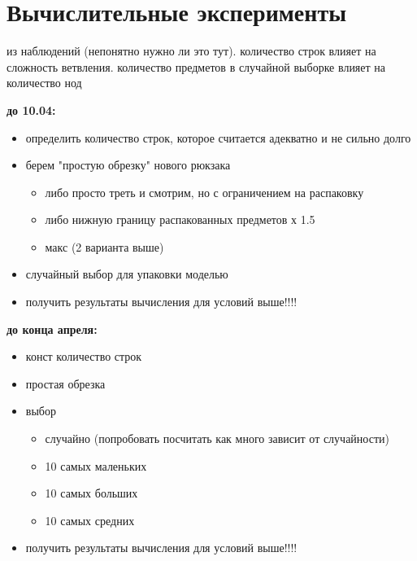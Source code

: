 \documentclass[a4paper]{article}
\begin{document}
    
    \section{Вычислительные эксперименты}

    из наблюдений (непонятно нужно ли это тут). количество строк влияет на сложность ветвления. количество предметов в случайной выборке влияет на количество нод 
        
    \begin{tcolorbox}[
        colback=red!5,
        colframe=black!50,
        title=Промежуточный план работы,
        sharp corners,
        boxrule=0.5pt,
        left=1mm,right=1mm,top=1mm,bottom=1mm
    ]

    \textbf{до 10.04:}
    \begin{itemize}
        \setlength{\itemsep}{0.15em}
        \setlength{\parskip}{0pt}
        \setlength{\parsep}{0pt}
        \item определить количество строк, которое считается адекватно и не сильно долго
        \item берем "простую обрезку" нового рюкзака
        \begin{itemize}
            \setlength{\itemsep}{0.15em}
            \setlength{\parskip}{0pt}
            \setlength{\parsep}{0pt}
            \item либо просто треть и смотрим, но с ограничением на распаковку
            \item либо нижную границу распакованных предметов х 1.5
            \item макс (2 варианта выше)
        \end{itemize}
        \item случайный выбор для упаковки моделью
        \item получить результаты вычисления для условий выше!!!!
    \end{itemize}
    
    \textbf{до конца апреля:}
    \begin{itemize}
        \setlength{\itemsep}{0.15em}
        \setlength{\parskip}{0pt}
        \setlength{\parsep}{0pt}
        \item конст количество строк
        \item простая обрезка
        \item выбор
        \begin{itemize}
            \setlength{\itemsep}{0.15em}
            \setlength{\parskip}{0pt}
            \setlength{\parsep}{0pt}
            \item случайно (попробовать посчитать как много зависит от случайности)
            \item 10 самых маленьких
            \item 10 самых больших
            \item 10 самых средних
        \end{itemize}
        \item получить результаты вычисления для условий выше!!!!
    \end{itemize}
    
    \end{tcolorbox}
\end{document}
